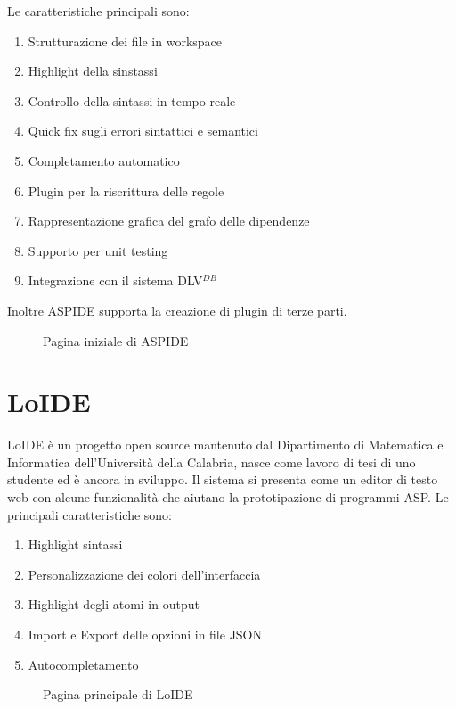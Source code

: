 Le caratteristiche principali sono:
\begin{enumerate}
	\item Strutturazione dei file in workspace
	\item Highlight della sinstassi
	\item Controllo della sintassi in tempo reale
	\item Quick fix sugli errori sintattici e semantici
	\item Completamento automatico
	\item Plugin per la riscrittura delle regole
	\item Rappresentazione grafica del grafo delle dipendenze
	\item Supporto per unit testing
	\item Integrazione con il sistema DLV$^{DB}$
\end{enumerate}
Inoltre ASPIDE supporta la creazione di plugin di terze parti.
\begin{figure}[H]
	\centering
	\caption{Pagina iniziale di ASPIDE}
\end{figure}

\section{LoIDE}

LoIDE è un progetto open source mantenuto dal Dipartimento di Matematica e Informatica dell'Università della Calabria, nasce come lavoro di tesi di uno studente ed è ancora in sviluppo.
Il sistema si presenta come un editor di testo web con alcune funzionalità che aiutano la prototipazione di programmi ASP.
Le principali caratteristiche sono:
\begin{enumerate}
	\item Highlight sintassi
	\item Personalizzazione dei colori dell'interfaccia
	\item Highlight degli atomi in output 
	\item Import e Export delle opzioni in file JSON
	\item Autocompletamento
\end{enumerate}

\begin{figure}[H]
	\centering
	\caption{Pagina principale di LoIDE}
\end{figure}